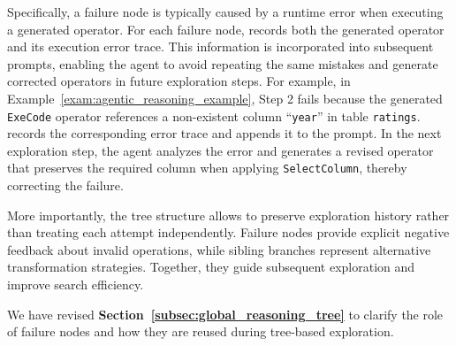 Specifically, a failure node is typically caused by a runtime error when executing a generated operator. For each failure node, \sys records both the generated operator and its execution error trace. This information is incorporated into subsequent prompts, enabling the agent to avoid repeating the same mistakes and generate corrected operators in future exploration steps.
For example, in Example~\ref{exam:agentic_reasoning_example}, Step 2 fails because the generated \texttt{ExeCode} operator references a non-existent column ``\texttt{year}'' in table \texttt{ratings}. \sys records the corresponding error trace and appends it to the prompt. In the next exploration step, the agent analyzes the error and generates a revised operator that preserves the required column when applying \texttt{SelectColumn}, thereby correcting the failure.

More importantly, the tree structure allows \sys to preserve exploration history rather than treating each attempt independently. Failure nodes provide explicit negative feedback about invalid operations, while sibling branches represent alternative transformation strategies. Together, they guide subsequent exploration and improve search efficiency.

{
We have revised \textbf{Section~\ref{subsec:global_reasoning_tree}} to clarify the role of failure nodes and how they are reused during tree-based exploration.
}



